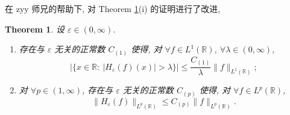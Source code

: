 \documentclass[a4paper,11pt]{article}
\newtheorem{theorem}{Theorem}[section]
\theoremstyle{definition}
\begin{document}
\begin{CJK*}{UTF8}{gbsn}
在 zyy 师兄的帮助下, 对 Theorem \ref{thm1}(i) 的证明进行了改进,

\begin{theorem} \label{thm1}
    设 $ \varepsilon \in (0, \infty) $. 
    \begin{enumerate}[{\rm(i)}]
        \item 存在与 $ \varepsilon $ 无关的正常数 $ C_{(1)} $ 使得, 
            对 $ \forall f \in L^1(\mathbb{R}) $, $ \forall \lambda \in (0, \infty) $,
            $$ 
                |\{ x \in \mathbb{R} :\ |H_\varepsilon (f) (x)| > \lambda \}| 
                    \leq \frac{C_{(1)}}{\lambda} \| f \|_{L^1(\mathbb{R})};
            $$
        \item 对 $ \forall p \in (1, \infty) $, 存在与 $ \varepsilon $ 无关的正常数 $ C_{(p)} $ 使得, 
            对 $ \forall f \in L^p(\mathbb{R}) $, 
            $$ 
                \| H_\varepsilon (f) \|_{L^p(\mathbb{R})} \leq C_{(p)} \| f \|_{L^p(\mathbb{R})}.
            $$
    \end{enumerate}
\end{theorem}


\end{CJK*}
\end{document}
